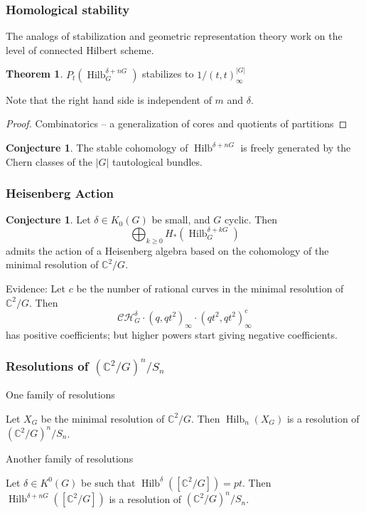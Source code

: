 \documentclass{amsart}[12pt]
\theoremstyle{definition}
\newtheorem{theorem}[dummy]{Theorem}
\newtheorem{conjecture}[dummy]{Conjecture}
\newcommand{\C}{\mathbb{C}}
\DeclareMathOperator{\Hilb}{Hilb}
\begin{document}
\subsubsection{Homological stability}

The analogs of stabilization and geometric representation theory work on the level of connected Hilbert scheme.

\begin{theorem} 
$P_t(\Hilb^{\delta+nG}_G)$ stabilizes to $1/(t,t)_\infty^{|G|}$
\end{theorem}
Note that the right hand side is independent of $m$ and $\delta$.
\begin{proof} Combinatorics -- a generalization of cores and quotients of partitions \end{proof}

\begin{conjecture}
The stable cohomology of $\Hilb^{\delta+nG}$ is freely generated by the Chern classes of the $|G|$ tautological bundles.
\end{conjecture}



\subsubsection{Heisenberg Action}


\begin{conjecture}
Let $\delta\in K_0(G)$ be small, and $G$ cyclic.  Then
$$\bigoplus_{k\geq 0} H_*(\Hilb^{\delta+kG}_G)$$ admits the action of a Heisenberg algebra based on the cohomology of the minimal resolution of $\C^2/G$.
\end{conjecture}

Evidence:
Let $c$ be the number of rational curves in the minimal resolution of $\C^2/G$.  Then
$$\mathcal{CH}^\delta_G\cdot(q,qt^2)_\infty\cdot (qt^2,qt^2)_\infty^c$$
has positive coefficients; but higher powers start giving negative coefficients.


\subsubsection{Resolutions of $(\C^2/G)^n/S_n$}
One family of resolutions

Let $X_G$ be the minimal resolution of $\C^2/G$.  Then $\Hilb_n(X_G)$ is a resolution of $(\C^2/G)^n/S_n$.


Another family of resolutions

Let $\delta\in K^0(G)$ be such that $\Hilb^\delta([\C^2/G])=pt$.  Then $\Hilb^{\delta+nG}([\C^2/G])$ is a resolution of $(\C^2/G)^n/S_n$.  
\end{document}
